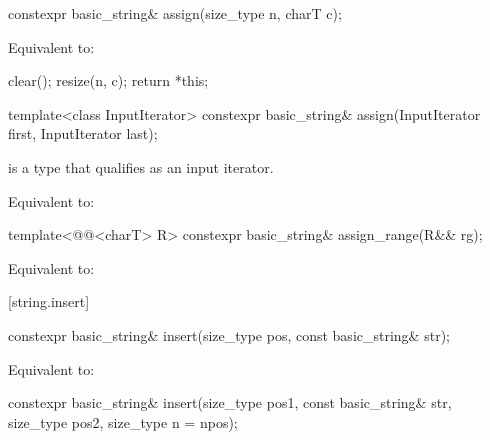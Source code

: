 %
\begin{itemdecl}
constexpr basic_string& assign(size_type n, charT c);
\end{itemdecl}

\begin{itemdescr}
\pnum
\effects
Equivalent to:
\begin{codeblock}
clear();
resize(n, c);
return *this;
\end{codeblock}
\end{itemdescr}

%
\begin{itemdecl}
template<class InputIterator>
  constexpr basic_string& assign(InputIterator first, InputIterator last);
\end{itemdecl}

\begin{itemdescr}
\pnum
\constraints
{} is a type that qualifies as an input
iterator.

\pnum
\effects
Equivalent to: 
\end{itemdescr}

%
\begin{itemdecl}
template<@@<charT> R>
  constexpr basic_string& assign_range(R&& rg);
\end{itemdecl}

\begin{itemdescr}
\pnum
\effects
Equivalent to: 
\end{itemdescr}

[string.insert]{}

%
\begin{itemdecl}
constexpr basic_string& insert(size_type pos, const basic_string& str);
\end{itemdecl}

\begin{itemdescr}
\pnum
\effects
Equivalent to: 
\end{itemdescr}

%
\begin{itemdecl}
constexpr basic_string& insert(size_type pos1, const basic_string& str,
                               size_type pos2, size_type n = npos);
\end{itemdecl}

